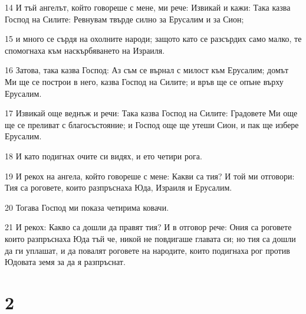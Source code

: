 \par 14 И тъй ангелът, който говореше с мене, ми рече: Извикай и кажи: Така казва Господ на Силите: Ревнувам твърде силно за Ерусалим и за Сион;
\par 15 и много се сърдя на охолните народи; защото като се разсърдих само малко, те спомогнаха към наскърбяването на Израиля.
\par 16 Затова, така казва Господ: Аз съм се върнал с милост към Ерусалим; домът Ми ще се построи в него, казва Господ на Силите; и връв ще се опъне върху Ерусалим.
\par 17 Извикай още веднъж и речи: Така казва Господ на Силите: Градовете Ми още ще се преливат с благосъстояние; и Господ още ще утеши Сион, и пак ще избере Ерусалим.
\par 18 И като подигнах очите си видях, и ето четири рога.
\par 19 И рекох на ангела, който говореше с мене: Какви са тия? И той ми отговори: Тия са роговете, които разпръснаха Юда, Израиля и Ерусалим.
\par 20 Тогава Господ ми показа четирима ковачи.
\par 21 И рекох: Какво са дошли да правят тия? И в отговор рече: Ония са роговете които разпръснаха Юда тъй че, никой не повдигаше главата си; но тия са дошли да ги уплашат, и да повалят роговете на народите, които подигнаха рог против Юдовата земя за да я разпръснат.

\chapter{2}

